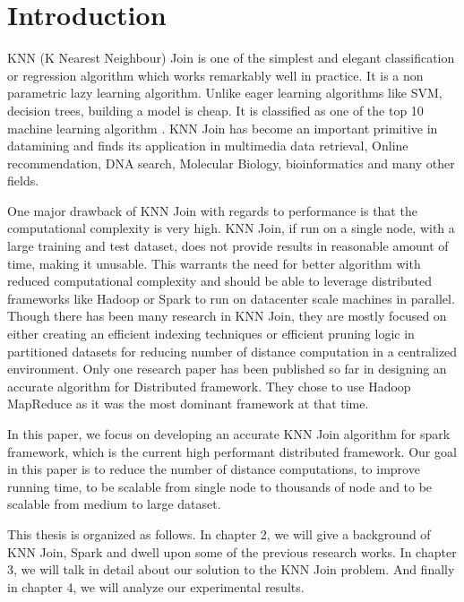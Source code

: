 \chapter{Introduction}


KNN (K Nearest Neighbour) Join is one of the simplest and elegant
classification or regression algorithm which works remarkably well in
practice. It is a non parametric lazy learning algorithm. Unlike eager
learning algorithms like SVM, decision trees, building a model is
cheap. It is
classified as one of the top 10 machine learning algorithm \cite{wu_top_2008}. KNN Join
has become an important primitive in datamining and
finds its application in multimedia data retrieval, Online
recommendation, DNA search,
Molecular Biology, bioinformatics  and
many other fields.

\medskip

One major drawback of KNN Join with regards to performance is that the computational complexity is
very high. KNN Join, if run on a single node, with a
large training and test dataset, does not provide results in reasonable amount of time, making it
unusable. This warrants the need for better algorithm with
reduced computational complexity and should be able to
leverage distributed frameworks like Hadoop \cite{hadoop_mr} or Spark
\cite{apache_spark} to run on datacenter scale machines in parallel.
Though there has been many research in KNN Join, they are mostly focused on either creating
an efficient indexing techniques or efficient pruning logic in
partitioned datasets for reducing
number of distance computation in a centralized environment.
Only one
research paper \cite{lu_efficient_2012} has been published so far in
designing an accurate algorithm
for Distributed framework. They chose to use Hadoop MapReduce as it
was the most dominant framework at that time.


In this paper, we focus on
developing an accurate KNN Join algorithm for spark framework, which is
the current high performant distributed framework. Our goal in this
paper is to reduce the number of distance computations, to improve running time,
to be scalable from single node to thousands of node and to be scalable from
medium to large dataset.

This thesis is organized as follows. In chapter 2, we will give a
background of KNN Join, Spark and dwell upon some of the previous
research works. In chapter 3, we will talk in detail about our
solution to the KNN Join problem. And finally in chapter 4, we will analyze our
experimental results.
